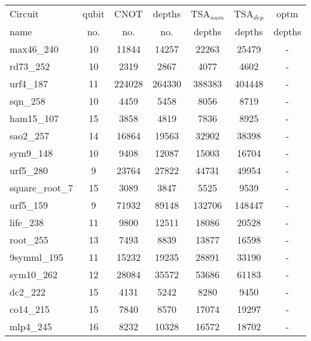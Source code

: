\documentclass[journal]{IEEEtran}
\begin{document}
                        \begin{table*}[!th]
                          \begin{center}
                            \begin{tabular}{|p{4.3cm}<{\centering}|c|c|c|c|c|c|}
                            \hline
                            Circuit &  qubit  & CNOT &depths &TSA$_{num}$& TSA$_{dep}$  & optm 	  	\\
                            name	&   no. 	&	no. & no. & depths&  depths &  depths 	\\
                           \hline
                           max46\_240 & 10 & 11844 & 14257 & 22263 & 25479 & - \\
                           rd73\_252 & 10 & 2319 & 2867 & 4077 & 4602 & - \\
                           urf4\_187 & 11 & 224028 & 264330 & 388383 & 404448 & - \\
                           sqn\_258 & 10 & 4459 & 5458 & 8056 & 8719 & - \\
                           ham15\_107 & 15 & 3858 & 4819 & 7836 & 8925 & - \\
                           sao2\_257 & 14 & 16864 & 19563 & 32902 & 38398 & - \\
                           sym9\_148 & 10 & 9408 & 12087 & 15003 & 16704 & - \\
                           urf5\_280 & 9 & 23764 & 27822 & 44731 & 49954 & - \\
                           square\_root\_7 & 15 & 3089 & 3847 & 5525 & 9539 & - \\
                           urf5\_159 & 9 & 71932 & 89148 & 132706 & 148447 & - \\
                           life\_238 & 11 & 9800 & 12511 & 18086 & 20528 & - \\
                           root\_255 & 13 & 7493 & 8839 & 13877 & 16598 & - \\
                           9symml\_195 & 11 & 15232 & 19235 & 28891 & 33190 & - \\
                           sym10\_262 & 12 & 28084 & 35572 & 53686 & 61183 & - \\
                           dc2\_222 & 15 & 4131 & 5242 & 8280 & 9450 & - \\
                           co14\_215 & 15 & 7840 & 8570 & 17074 & 19297 & - \\
                           mlp4\_245 & 16 & 8232 & 10328 & 16572 & 18702 & - \\

\end{tabular}
\end{center}
\end{table*}
\end{document}
